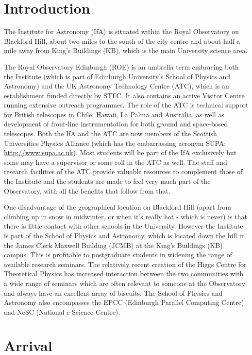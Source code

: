 \section{Introduction}

The Institute for Astronomy (IfA) is situated within the Royal Observatory on Blackford Hill, about two miles to the south of the city centre and about half a mile away from King's Buildings (KB), which is the main University science area.

The Royal Observatory Edinburgh (ROE) is an umbrella term embracing both the Institute (which is part of Edinburgh University's School of Physics and Astronomy) and the UK Astronomy Technology Centre (ATC), which is an establishment funded directly by STFC. It also contains an active Visitor Centre running extensive outreach programmes. The role of the ATC is technical support for British telescopes in Chile, Hawaii, La Palma and Australia, as well as development of front-line instrumentation for both ground and space-based telescopes. Both the IfA and the ATC are now members of the Scottish Universities Physics Alliance (which has the embarrassing acronym SUPA; \url{http://www.supa.ac.uk}). Most students will be part of the IfA exclusively but some may have a supervisor or some roll in the ATC as well. The staff and research facilities of the ATC provide valuable resources to complement those of the Institute and the students are made to feel very much part of the Observatory, with all the benefits that follow from that.

One disadvantage of the geographical location on Blackford Hill (apart from climbing up in snow in midwinter, or when it's really hot - which is never) is that there is little contact with other schools in the University. However the Institute is part of the School of Physics and Astronomy, which is located down the hill in the James Clerk Maxwell Building (JCMB) at the King's Buildings (KB) campus. This is profitable to postgraduate students in widening the range of available research seminars. The relatively recent creation of the Higgs Centre for Theoretical Physics has increased interaction between the two communities with a wide range of seminars which are often relevant to someone at the Observatory and always have an excellent array of biscuits. The School of Physics and Astronomy also encompasses the EPCC (Edinburgh Parallel Computing Centre) and NeSC (National e-Science Centre).

\section{Arrival}

